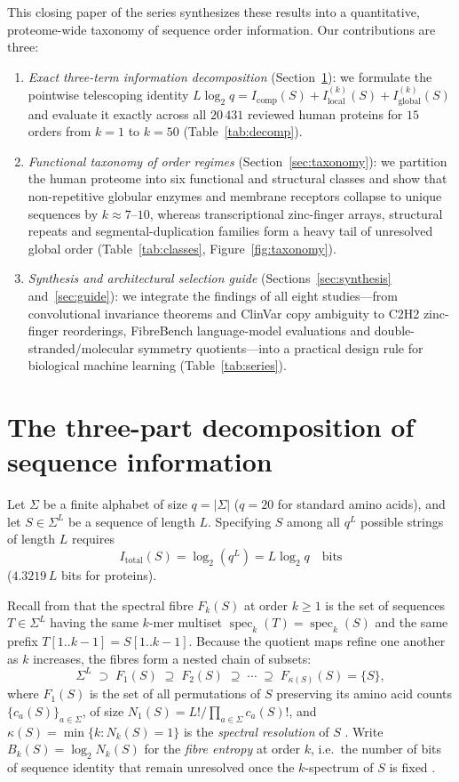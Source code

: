 \documentclass[11pt]{article}
\theoremstyle{plain}
\theoremstyle{definition}
\theoremstyle{remark}
\newcommand{\spec}{\operatorname{spec}}
\begin{document}
This closing paper of the series synthesizes these results into a quantitative, proteome-wide taxonomy of
sequence order information. Our contributions are three:
\begin{enumerate}
\item \emph{Exact three-term information decomposition} (Section~\ref{sec:decomposition}): we formulate the
pointwise telescoping identity $L\log_2 q = I_{\mathrm{comp}}(S) + I_{\mathrm{local}}^{(k)}(S) + I_{\mathrm{global}}^{(k)}(S)$
and evaluate it exactly across all $20\,431$ reviewed human proteins for $15$ orders from $k=1$ to $k=50$
(Table~\ref{tab:decomp}).
\item \emph{Functional taxonomy of order regimes} (Section~\ref{sec:taxonomy}): we partition the human proteome into
six functional and structural classes and show that non-repetitive globular enzymes and membrane receptors collapse
to unique sequences by $k\approx7$--$10$, whereas transcriptional zinc-finger arrays, structural repeats and
segmental-duplication families form a heavy tail of unresolved global order (Table~\ref{tab:classes},
Figure~\ref{fig:taxonomy}).
\item \emph{Synthesis and architectural selection guide} (Sections~\ref{sec:synthesis} and~\ref{sec:guide}): we
integrate the findings of all eight studies—from convolutional invariance theorems and ClinVar copy ambiguity to
C2H2 zinc-finger reorderings, FibreBench language-model evaluations and double-stranded/molecular symmetry
quotients—into a practical design rule for biological machine learning (Table~\ref{tab:series}).
\end{enumerate}

\section{The three-part decomposition of sequence information}\label{sec:decomposition}

Let $\Sigma$ be a finite alphabet of size $q=|\Sigma|$ ($q=20$ for standard amino acids), and let $S\in\Sigma^L$ be
a sequence of length $L$. Specifying $S$ among all $q^L$ possible strings of length $L$ requires
\[
I_{\mathrm{total}}(S)=\log_2(q^L)=L\log_2 q\quad\text{bits}
\]
($4.3219\,L$ bits for proteins).

Recall from \cite{CC26c} that the spectral fibre $F_k(S)$ at order $k\ge1$ is the set of sequences $T\in\Sigma^L$
having the same $k$-mer multiset $\spec_k(T)=\spec_k(S)$ and the same prefix $T[1..k-1]=S[1..k-1]$. Because the
quotient maps refine one another as $k$ increases, the fibres form a nested chain of subsets:
\[
\Sigma^L \;\supset\; F_1(S) \;\supseteq\; F_2(S) \;\supseteq\; \cdots \;\supseteq\; F_{\kappa(S)}(S)=\{S\},
\]
where $F_1(S)$ is the set of all permutations of $S$ preserving its amino acid counts $\{c_a(S)\}_{a\in\Sigma}$,
of size $N_1(S)=L!\big/\prod_{a\in\Sigma}c_a(S)!$, and $\kappa(S)=\min\{k:N_k(S)=1\}$ is the \emph{spectral
resolution} of $S$ \cite{CC26a,CC26b}. Write $B_k(S)=\log_2 N_k(S)$ for the \emph{fibre entropy} at order $k$, i.e.\
the number of bits of sequence identity that remain unresolved once the $k$-spectrum of $S$ is fixed \cite{CC26c}.
\end{document}
